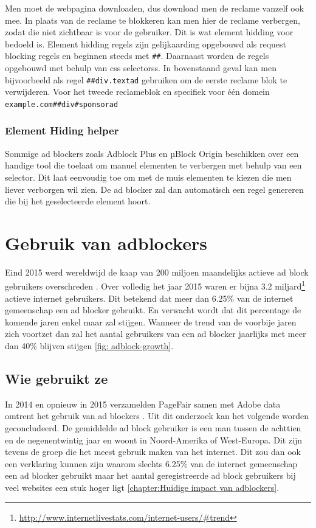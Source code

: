 \documentclass[pdftex,a4paper,12pt,twoside]{report}
\begin{document}
Men moet de webpagina downloaden, dus download men de reclame vanzelf ook mee. In plaats van de reclame te blokkeren kan men hier de reclame verbergen, zodat die niet zichtbaar is voor de gebruiker. Dit is wat element hidding voor bedoeld is. Element hidding regels zijn gelijkaarding opgebouwd als request blocking regels en beginnen steeds met \texttt{\#\#}. Daarnaast worden de regels opgebouwd met behulp van \glspl{css selectors}. In bovenstaand geval kan men bijvoorbeeld als regel \texttt{\#\#div.textad} gebruiken om de eerste reclame blok te verwijderen. Voor het tweede reclameblok en specifiek voor één domein \texttt{example.com\#\#div\#sponsorad}

\subsection{Element Hiding helper}
\label{sec Element Hiding helper} 
Sommige ad blockers zoals Adblock Plus en µBlock Origin beschikken over een handige tool die toelaat om manuel elementen te verbergen met behulp van een selector. Dit laat eenvoudig toe om met de muis elementen te kiezen die men liever verborgen wil zien. De ad blocker zal dan automatisch een regel genereren die bij het geselecteerde element hoort.

\chapter{Gebruik van adblockers}
\label{ch:Gebruik van adblockers}
Eind 2015 werd wereldwijd de kaap van 200 miljoen maandelijks actieve ad block gebruikers overschreden \citep{PageFair2015}. Over volledig het jaar 2015 waren er bijna 3.2 miljard\footnote{\url{ http://www.internetlivestats.com/internet-users/\#trend}} actieve internet gebruikers. Dit betekend dat meer dan 6.25\% van de internet gemeenschap een ad blocker gebruikt. En verwacht wordt dat dit percentage de komende jaren enkel maar zal stijgen. Wanneer de trend van de voorbije jaren zich voortzet dan zal het aantal gebruikers van een ad blocker jaarlijks met meer dan 40\% blijven stijgen \ref{fig: adblock-growth}.

\section{Wie gebruikt ze}
\label{sec:Wie gebruikt ze}
In 2014 en opnieuw in 2015 verzamelden PageFair samen met Adobe data omtrent het gebruik van ad blockers \citep{PageFair2015,PageFair2014}. Uit dit onderzoek kan het volgende worden geconcludeerd. 
De gemiddelde ad block gebruiker is een man tussen de achttien en de negenentwintig jaar en woont in Noord-Amerika of West-Europa. Dit zijn tevens de groep die het meest gebruik maken van het internet. Dit zou dan ook een verklaring kunnen zijn waarom slechts 6.25\% van de internet gemeenschap een ad blocker gebruikt maar het aantal geregistreerde ad block gebruikers bij veel websites een stuk hoger ligt \ref{chapter:Huidige impact van adblockers}.
\end{document}
